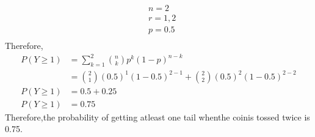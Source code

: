 \documentclass[10pt,twocolumn]{article}
\begin{document}
\begin{align*}
	&n = 2\\
	&r = 1,2\\
	&p = 0.5\\
\end{align*}
Therefore,
\begin{align}
	P(Y\geq 1)&=\sum_{k=1}^2 \binom nk p^k(1-p)^{n-k}\\
	&=\binom 21(0.5)^1(1-0.5)^{2-1}+\binom 22 (0.5)^2(1-0.5)^{2-2}\\
	P(Y\geq 1)&=0.5+0.25\\
	P(Y\geq 1)&= 0.75
\end{align}
Therefore,the probability of getting atleast one tail whenthe coinis tossed twice is 0.75.\\
\end{document}
